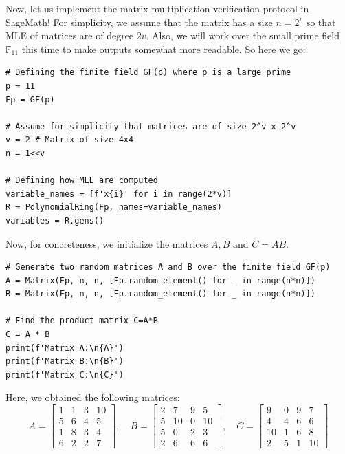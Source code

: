\documentclass[../../book.tex]{subfiles}
\begin{document}
Now, let us implement the matrix multiplication verification protocol in
SageMath! For simplicity, we assume that the matrix has a size $n=2^v$ so that
MLE of matrices are of degree $2v$. Also, we will work over the small prime
field $\mathbb{F}_{11}$ this time to make outputs somewhat more readable. 
So here we go:
\begin{verbatim}
# Defining the finite field GF(p) where p is a large prime
p = 11
Fp = GF(p)

# Assume for simplicity that matrices are of size 2^v x 2^v
v = 2 # Matrix of size 4x4
n = 1<<v

# Defining how MLE are computed
variable_names = [f'x{i}' for i in range(2*v)]
R = PolynomialRing(Fp, names=variable_names)
variables = R.gens()
\end{verbatim}

Now, for concreteness, we initialize the matrices $A,B$ and $C=AB$.
\begin{verbatim}
# Generate two random matrices A and B over the finite field GF(p)
A = Matrix(Fp, n, n, [Fp.random_element() for _ in range(n*n)])
B = Matrix(Fp, n, n, [Fp.random_element() for _ in range(n*n)])

# Find the product matrix C=A*B
C = A * B
print(f'Matrix A:\n{A}')
print(f'Matrix B:\n{B}')
print(f'Matrix C:\n{C}')
\end{verbatim}

Here, we obtained the following matrices:
\begin{equation*}
    A = \begin{bmatrix}
    1 & 1 & 3 & 10 \\
    5 & 6 & 4 & 5 \\
    1 & 8 & 3 & 4 \\
    6 & 2 & 2 & 7
    \end{bmatrix}, \quad B = \begin{bmatrix}
    2 & 7 & 9 & 5 \\
    5 & 10 & 0 & 10 \\
    5 & 0 & 2 & 3 \\
    2 & 6 & 6 & 6
    \end{bmatrix}, \quad C = \begin{bmatrix}
    9 & 0 & 9 & 7 \\
    4 & 4 & 6 & 6 \\
    10 & 1 & 6 & 8 \\
    2 & 5 & 1 & 10
    \end{bmatrix}
\end{equation*}
\end{document}
